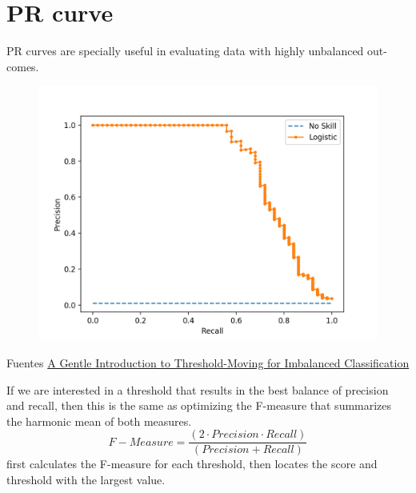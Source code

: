 \documentclass[12pt, a4paper]{book}
\begin{document}
\section{PR curve}
PR curves are specially useful in evaluating data with highly unbalanced out-comes.
\begin{figure}[H]
	\centering
	\includegraphics[scale=0.2]{PR}
	\caption{}
\end{figure}
Fuentes \href{https://machinelearningmastery.com/threshold-moving-for-imbalanced-classification/}{A Gentle Introduction to Threshold-Moving for Imbalanced Classification}

If we are interested in a threshold that results in the best balance of precision and recall, then this is the same as optimizing the F-measure that summarizes the harmonic mean of both measures.
\begin{equation}
	F-Measure = \frac{(2 \cdot Precision \cdot  Recall) }{(Precision + Recall)} 
\end{equation}
first calculates the F-measure for each threshold, then locates the score and threshold with the largest value.
\end{document}
